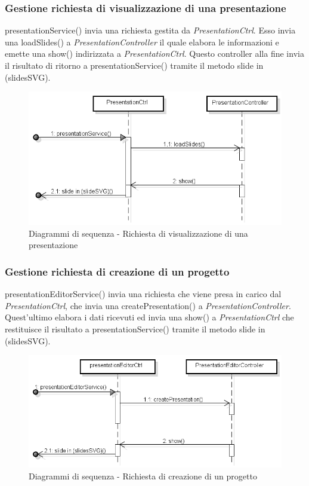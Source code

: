 \newpage	
	\subsubsection{Gestione richiesta di visualizzazione di una presentazione}
	presentationService() invia una richiesta gestita da \textit{PresentationCtrl}. Esso invia una loadSlides() a \textit{PresentationController} il quale elabora le informazioni e emette una show() indirizzata a \textit{PresentationCtrl}. Questo controller alla fine invia il risultato di ritorno a presentationService() tramite il metodo slide in (slidesSVG).
	
	\begin{figure}[H]
		\centering
		\includegraphics[scale=0.5]{img/view.png}
		\caption{Diagrammi di sequenza - Richiesta di visualizzazione di una presentazione}
	\end{figure} 
	
	
	\subsubsection{Gestione richiesta di creazione di un progetto}
	presentationEditorService() invia una richiesta che viene presa in carico dal \textit{PresentationCtrl}, che invia una createPresentation() a \textit{PresentationController}. Quest'ultimo elabora i dati ricevuti ed invia una show() a \textit{PresentationCtrl} che restituisce il risultato a presentationService() tramite il metodo slide in (slidesSVG).
	
	\begin{figure}[H]
		\centering
		\includegraphics[scale=0.5]{img/create.png}
		\caption{Diagrammi di sequenza - Richiesta di creazione di un progetto}
	\end{figure}
	
